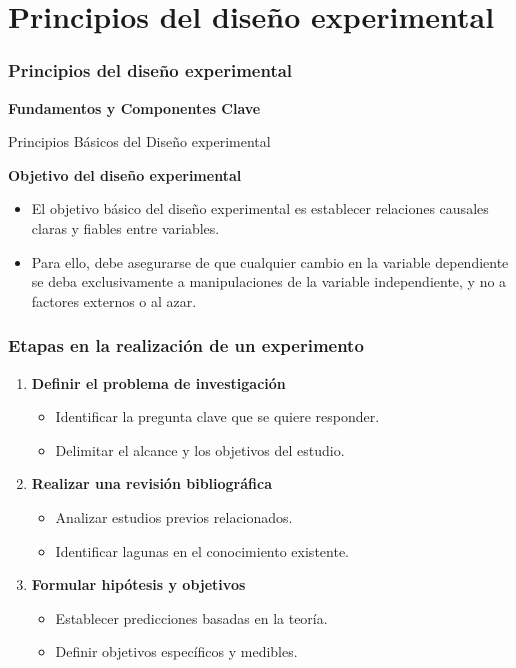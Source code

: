 ﻿\documentclass{beamer}
\begin{document}
\section{Principios del diseño experimental}
\begin{frame}
    \frametitle{Principios del diseño experimental}
    \centering
    \textbf{\Large Fundamentos y Componentes Clave}
    \vspace{0.5cm}
\end{frame}

\begin{frame}{Principios Básicos del Diseño experimental}

\textbf{Objetivo del diseño experimental}
\begin{itemize}
    \item El objetivo básico del diseño experimental es establecer relaciones causales claras y fiables entre variables.
    \item Para ello, debe asegurarse de que cualquier cambio en la variable dependiente se deba exclusivamente a manipulaciones de la variable independiente, y no a factores externos o al azar.
\end{itemize}

\end{frame}

\begin{frame}
\frametitle{Etapas en la realización de un experimento}
\begin{enumerate}
    \item \textbf{Definir el problema de investigación}
    \begin{itemize}
        \item Identificar la pregunta clave que se quiere responder.
        \item Delimitar el alcance y los objetivos del estudio.
    \end{itemize}
    \vspace{0.3cm}
    \item \textbf{Realizar una revisión bibliográfica}
    \begin{itemize}
        \item Analizar estudios previos relacionados.
        \item Identificar lagunas en el conocimiento existente.
    \end{itemize}
    \vspace{0.3cm}
    \item \textbf{Formular hipótesis y objetivos}
    \begin{itemize}
        \item Establecer predicciones basadas en la teoría.
        \item Definir objetivos específicos y medibles.
    \end{itemize}
\end{enumerate}
\end{frame}
\end{document}
